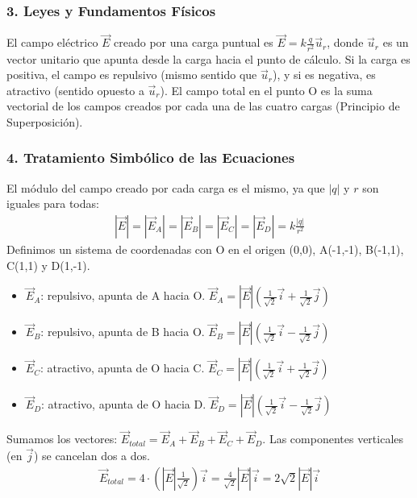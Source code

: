 \subsubsection*{3. Leyes y Fundamentos Físicos}
El campo eléctrico $\vec{E}$ creado por una carga puntual es $\vec{E} = k \frac{q}{r^2}\vec{u}_r$, donde $\vec{u}_r$ es un vector unitario que apunta desde la carga hacia el punto de cálculo. Si la carga es positiva, el campo es repulsivo (mismo sentido que $\vec{u}_r$), y si es negativa, es atractivo (sentido opuesto a $\vec{u}_r$).
El campo total en el punto O es la suma vectorial de los campos creados por cada una de las cuatro cargas (Principio de Superposición).

\subsubsection*{4. Tratamiento Simbólico de las Ecuaciones}
El módulo del campo creado por cada carga es el mismo, ya que $|q|$ y $r$ son iguales para todas:
\begin{gather}
    |\vec{E}| = |\vec{E}_A| = |\vec{E}_B| = |\vec{E}_C| = |\vec{E}_D| = k \frac{|q|}{r^2}
\end{gather}
Definimos un sistema de coordenadas con O en el origen (0,0), A(-1,-1), B(-1,1), C(1,1) y D(1,-1).
\begin{itemize}
    \item $\vec{E}_A$: repulsivo, apunta de A hacia O. $\vec{E}_A = |\vec{E}|(\frac{1}{\sqrt{2}}\vec{i} + \frac{1}{\sqrt{2}}\vec{j})$
    \item $\vec{E}_B$: repulsivo, apunta de B hacia O. $\vec{E}_B = |\vec{E}|(\frac{1}{\sqrt{2}}\vec{i} - \frac{1}{\sqrt{2}}\vec{j})$
    \item $\vec{E}_C$: atractivo, apunta de O hacia C. $\vec{E}_C = |\vec{E}|(\frac{1}{\sqrt{2}}\vec{i} + \frac{1}{\sqrt{2}}\vec{j})$
    \item $\vec{E}_D$: atractivo, apunta de O hacia D. $\vec{E}_D = |\vec{E}|(\frac{1}{\sqrt{2}}\vec{i} - \frac{1}{\sqrt{2}}\vec{j})$
\end{itemize}
Sumamos los vectores:
$\vec{E}_{total} = \vec{E}_A + \vec{E}_B + \vec{E}_C + \vec{E}_D$. Las componentes verticales (en $\vec{j}$) se cancelan dos a dos.
\begin{gather}
    \vec{E}_{total} = 4 \cdot \left(|\vec{E}|\frac{1}{\sqrt{2}}\right) \vec{i} = \frac{4}{\sqrt{2}}|\vec{E}|\vec{i} = 2\sqrt{2}|\vec{E}|\vec{i}
\end{gather}

